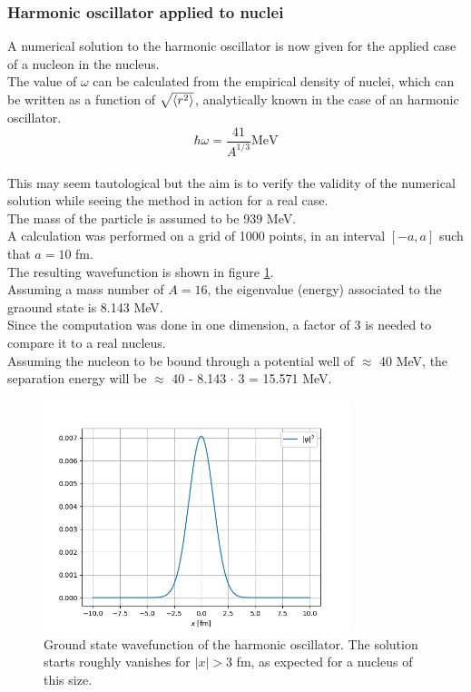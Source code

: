 \documentclass{article}
\begin{document}
\subsubsection{Harmonic oscillator applied to nuclei}
A numerical solution to the harmonic oscillator is now given for the applied case of a nucleon in the nucleus.
\\The value of $\omega$ can be calculated from the empirical density of nuclei, which can be written as a function of $\sqrt{\braket{r^2}}$, analytically known in the case of an harmonic oscillator.
\begin{equation}
    \hbar \omega = \frac{41}{A^{1/3}} \text{MeV}
\end{equation}
\\This may seem tautological but the aim is to verify the validity of the numerical solution while seeing the method in action for a real case.
\\The mass of the particle is assumed to be 939 MeV.
\\A calculation was performed on a grid of 1000 points, in an interval $[-a, a]$ such that $a=10$ fm.
\\The resulting wavefunction is shown in figure \ref{fig:1D_ho}.
\\Assuming a mass number of $A=16$, the eigenvalue (energy) associated to the graound state is 8.143 MeV.
\\Since the computation was done in one dimension, a factor of 3 is needed to compare it to a real nucleus.
\\Assuming the nucleon to be bound through a potential well of $\approx$ 40 MeV, the separation energy will be $\approx$ 40 - 8.143 $\cdot$ 3 = 15.571 MeV.
\begin{figure}[h]
\centering
\includegraphics[width=0.8\textwidth]{figures/1D_ho.png}
\caption{\label{fig:1D_ho} Ground state wavefunction of the harmonic oscillator. The solution starts roughly vanishes for $|x|>3$ fm, as expected for a nucleus of this size.}
\end{figure}
\end{document}
